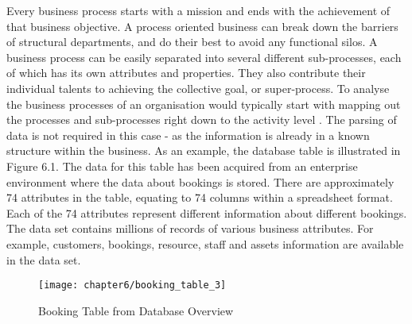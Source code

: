 Every business process starts with a mission and ends with the achievement of that business objective. A process oriented business can break down the barriers of structural departments, and do their best to avoid any functional silos. A business process can be easily separated into several different sub-processes, each of which has its own attributes and properties. They also contribute their individual talents to achieving the collective goal, or super-process. To analyse the business processes of an organisation would typically start with mapping out the processes and sub-processes right down to the activity level \cite{aguilar2004business}. The parsing of data is not required in this case - as the information is already in a known structure within the business. As an example, the database table is illustrated in Figure 6.1. The data for this table has been acquired from an enterprise environment where the data about bookings is stored. There are approximately 74 attributes in the table, equating to 74 columns within a spreadsheet format. Each of the 74 attributes represent different information about different bookings. The data set contains millions of records of various business attributes. For example, customers, bookings, resource, staff and assets information are available in the data set.\\

\begin{figure}[H]
\centering
\texttt{[image: chapter6/booking\_table\_3]}
\caption{Booking Table from Database Overview}
\end{figure}

